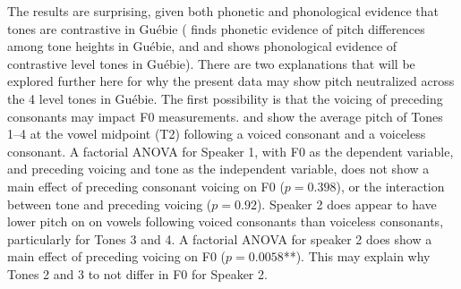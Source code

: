 \documentclass[output=paper]{langscibook}
\begin{document}
The results are surprising, given both phonetic and phonological evidence that tones are contrastive in Guébie (\cite{sande2020} finds phonetic evidence of pitch differences among tone heights in Guébie, and \cite{sande2017} and \cite{sande2018cross} shows phonological evidence of contrastive level tones in Guébie). There are two explanations that will be explored further here for why the present data may show pitch neutralized across the 4 level tones in Guébie. The first possibility is that the voicing of preceding consonants may impact F0 measurements.  and  show the average pitch of Tones 1--4 at the vowel midpoint (T2) following a voiced consonant and a voiceless consonant. A factorial ANOVA for Speaker 1, with F0 as the dependent variable, and preceding voicing and tone as the independent variable, does not show a main effect of preceding consonant voicing on F0 ($p=0.398$), or the interaction between tone and preceding voicing ($p=0.92$). Speaker 2 does appear to have lower pitch on on vowels following voiced consonants than voiceless consonants, particularly for Tones 3 and 4. A factorial ANOVA for speaker 2 does show a main effect of preceding voicing on F0 ($p=0.0058$**). This may explain why Tones 2 and 3 to not differ in F0 for Speaker 2.
\end{document}
